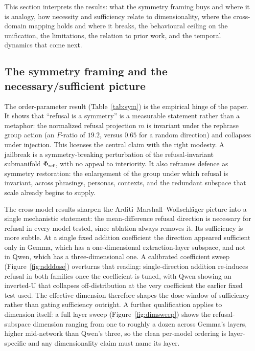 This section interprets the results: what the symmetry framing buys and where it is
analogy, how necessity and sufficiency relate to dimensionality, where the
cross-domain mapping holds and where it breaks, the behavioural ceiling on the
unification, the limitations, the relation to prior work, and the temporal dynamics
that come next.

\subsection{The symmetry framing and the necessary/sufficient picture}
The order-parameter result (Table~\ref{tab:sym}) is the empirical hinge of the
paper. It shows that ``refusal is a symmetry'' is a measurable statement rather than
a metaphor: the normalized refusal projection $m$ is invariant under the rephrase
group action (an $F$-ratio of $19.2$, versus $0.65$ for a random direction) and
collapses under injection. This licenses the central claim with the right modesty. A
jailbreak is a symmetry-breaking perturbation of the refusal-invariant submanifold
$\Phi_{\mathrm{ref}}$, with no appeal to interiority. It also reframes defence as symmetry
restoration: the enlargement of the group under which refusal is invariant, across
phrasings, personas, contexts, and the redundant subspace that scale already begins
to supply.

The cross-model results sharpen the Arditi--Marshall--Wollschl\"ager picture into a
single mechanistic statement: the mean-difference refusal direction is
necessary for refusal in every model tested, since ablation always removes it.
Its sufficiency is more subtle. At a single fixed addition coefficient the
direction appeared sufficient only in Gemma, which has a one-dimensional
extraction-layer subspace, and not in Qwen, which has a three-dimensional one. A
calibrated coefficient sweep (Figure~\ref{fig:adddose}) overturns that reading:
single-direction addition re-induces refusal in both families once the coefficient
is tuned, with Qwen showing an inverted-U that collapses off-distribution at the very
coefficient the earlier fixed test used. The effective dimension therefore shapes the
dose window of sufficiency rather than gating sufficiency outright. A further
qualification applies to dimension itself: a full layer sweep
(Figure~\ref{fig:dimsweep}) shows the refusal-subspace dimension ranging from one to
roughly a dozen across Gemma's layers, higher mid-network than Qwen's three, so the
clean per-model ordering is layer-specific and any dimensionality claim must name its
layer.

